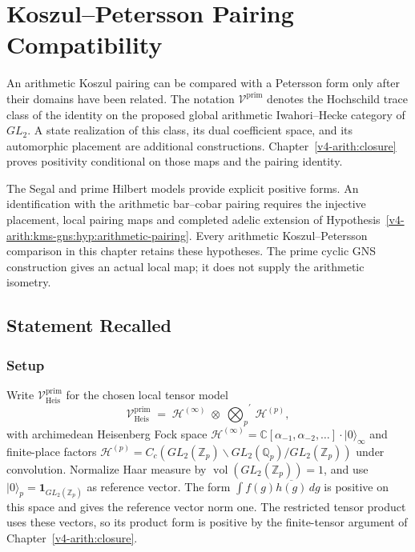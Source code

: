 \chapter{Koszul--Petersson Pairing Compatibility}
\label{v4-arith:kp-compat}

An arithmetic Koszul pairing can be compared with a Petersson form
only after their domains have been related. The notation
\(\mathcal V^{\mathrm{prim}}\) denotes the Hochschild trace class
of the identity on the proposed global arithmetic Iwahori--Hecke
category of \(GL_2\). A state realization of this class, its dual
coefficient space, and its automorphic placement are additional
constructions. Chapter~\ref{v4-arith:closure} proves positivity
conditional on those maps and the pairing identity.

The Segal and prime Hilbert models provide explicit positive forms.
An identification with the arithmetic bar--cobar pairing requires
the injective placement, local pairing maps and completed adelic
extension of Hypothesis~\ref{v4-arith:kms-gns:hyp:arithmetic-pairing}.
Every arithmetic Koszul--Petersson comparison in this chapter
retains these hypotheses. The prime cyclic GNS construction gives
an actual local map; it does not supply the arithmetic isometry.

\section{Statement Recalled}
\label{v4-arith:kp:statement}

\subsection{Setup}
\label{v4-arith:kp:setup}

Write \(\mathcal V^{\mathrm{prim}}_{\mathrm{Heis}}\) for the chosen
local tensor model
\begin{equation}
\label{v4-arith:kp:eq:Vprim-adelic}
\mathcal{V}^{\mathrm{prim}}_{\mathrm{Heis}}\;=\;
\mathcal{H}^{(\infty)}\;\otimes\;{\bigotimes_{p}}^{\!\prime}\,\mathcal{H}^{(p)},
\end{equation}
with archimedean Heisenberg Fock space
\(\mathcal{H}^{(\infty)}=\mathbb{C}[\alpha_{-1},\alpha_{-2},\ldots]\cdot|0\rangle_{\infty}\)
and finite-place factors
\(\mathcal{H}^{(p)}=C_{c}(GL_{2}(\mathbb{Z}_{p})\backslash GL_{2}(\mathbb{Q}_{p})/GL_{2}(\mathbb{Z}_{p}))\)
under convolution. Normalize Haar measure by
\(\operatorname{vol}(GL_2(\mathbb Z_p))=1\), and use
\(|0\rangle_p=\mathbf1_{GL_2(\mathbb Z_p)}\) as reference vector.
The form \(\int f(g)\overline{h(g)}\,dg\) is positive on this
space and gives the reference vector norm one. The restricted
tensor product uses these vectors, so its product form is positive
by the finite-tensor argument of Chapter~\ref{v4-arith:closure}.

